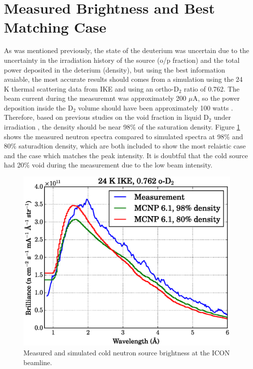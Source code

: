 \documentclass[5p,12pt]{elsarticle}
\begin{document}
%
%
%
%
%

\section{Measured Brightness and Best Matching Case}
\label{sec:results}

As was mentioned previously, the state of the deuterium was uncertain due to the uncertainty in the irradiation history of the source (o/p fraction) and the total power deposited in the deterium (density), but using the best information avaiable, the most accurate results should comes from a simulation using the 24 K thermal scattering data from IKE and using an ortho-D$_2$ ratio of 0.762.  The beam current during the measuremnt was approximately 200 $\mu$A, so the power deposition inside the D$_2$ volume should have been approximately 100 watts \cite{sinq_power}.  Therefore, based on previous studies on the void fraction in liquid D$_2$ under irradiation \cite{Siegwarth_Olson_Lewis_Rowe_Williams_1994}, the density should be near 98\% of the saturation density.  Figure \ref{fig:brightness} shows the measured neutron spectra compared to simulated spectra at 98\% and 80\% saturadtion density, which are both included to show the most relaistic case and the case which matches the peak intensity.  It is doubtful that the cold source had 20\% void during the measurement due to the low beam intensity.

\begin{figure}[h!] 
  \centering
    \includegraphics[width=\columnwidth]{graphics/brightness.eps}
     \caption{Measured and simulated cold neutron source brightness at the ICON beamline. \label{fig:brightness} }
\end{figure}
\end{document}
